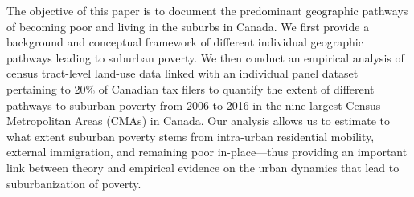 The objective of this paper is to document the predominant geographic pathways of becoming poor and living in the suburbs in Canada. We first provide a background and conceptual framework of different individual geographic pathways leading to suburban poverty. We then conduct an empirical analysis of census tract-level land-use data linked with an individual panel dataset pertaining to 20\% of Canadian tax filers to quantify the extent of different pathways to suburban poverty from 2006 to 2016 in the nine largest Census Metropolitan Areas (CMAs) in Canada. 
Our analysis allows us to estimate to what extent suburban poverty stems from intra-urban residential mobility, external immigration, and remaining poor in-place---thus providing an important link between theory and empirical evidence on the urban dynamics that lead to suburbanization of poverty.






